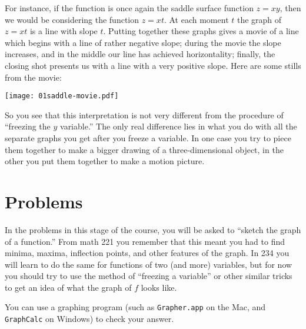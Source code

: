 For instance, if the function is once again the saddle surface
function $z=xy$, then we would be considering the function $z=xt$. At
each moment $t$ the graph of $z=xt$ is a line with slope $t$. Putting
together these graphs gives a movie of a line which begins with a line
of rather negative slope;  during the movie the slope increases,
and in the middle our line has achieved horizontality;  finally, the
closing shot presents us with a line with a very positive slope.
Here are some stills from the movie:

\begin{center}
  \texttt{[image: 01saddle-movie.pdf]}
\end{center}

So you see that this interpretation is not very different from the
procedure of ``freezing the $y$ variable.'' The only real difference
lies in what you do with all the separate graphs you get after you
freeze a variable. In one case you try to piece them together to make a
bigger drawing of a three-dimensional object, in the other you put them
together to make a motion picture.



\section*{Problems}  %

\problemfont

In the problems in this stage of the course, you will be asked to
``sketch the graph of a function.''  From math 221 you remember that
this meant you had to find minima, maxima, inflection points, and other
features of the graph.  In 234 you will learn to do the same for
functions of two (and more) variables, but for now you should try to
use the method of ``freezing a variable'' or other similar tricks to
get an idea of what the graph of $f$ looks like.  

You can use a graphing program (such as \texttt{Grapher.app} on the
Mac, and \texttt{GraphCalc} on Windows) to check your answer.

\begin{center}
\end{center}

